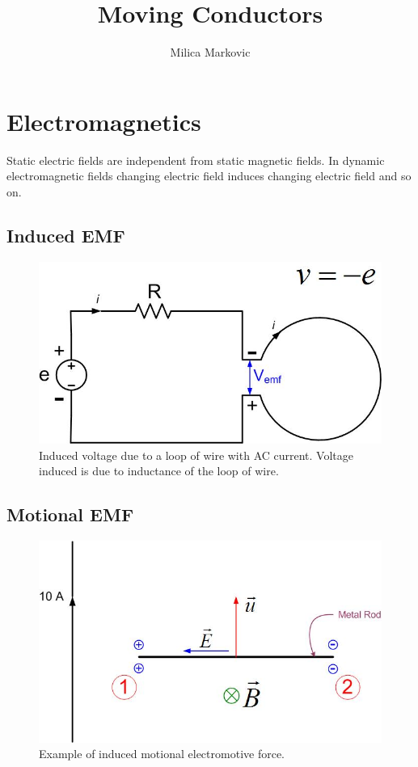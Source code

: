 \documentclass{ximera}
\title{Moving Conductors}
\author{Milica Markovic}
\begin{document}
  
\begin{abstract}  

\end{abstract}  
\maketitle    


\section{Electromagnetics}

 Static electric fields are independent from static magnetic fields. In dynamic electromagnetic fields changing electric field induces changing electric field and so on. 



\subsection{Induced EMF}




\begin{figure}[htbp]
\begin{center}
\includegraphics[scale=0.5]{../jpg/inducedvoltage.jpg}
\end{center}
\caption{Induced voltage due to a loop of wire with AC current. Voltage induced is due to inductance of the loop of wire.}
\label{inducedemf}
\end{figure}




\subsection{Motional EMF}


\begin{figure}[htbp]
\begin{center}
\includegraphics[scale=0.5]{../jpg/motionalemf.jpg}
\end{center}
\caption{Example of induced motional electromotive force.}
\label{inducedemf}
\end{figure}
\end{document}
